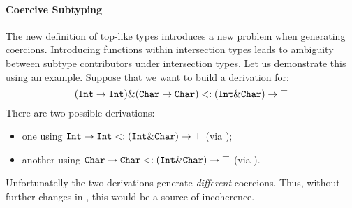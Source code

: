 
\paragraph{Coercive Subtyping}
The new definition of top-like types introduces a new problem when generating coercions. 
Introducing functions within intersection types leads to ambiguity between subtype contributors 
under intersection types.
Let us demonstrate this using an example.
Suppose that we want to build a derivation for:  
\[(\texttt{Int} \to \texttt{Int}) \& (\texttt{Char} \to \texttt{Char}) <: (\texttt{Int} \& \texttt{Char}) \to \top\]
There are two possible derivations: 

\begin{itemize}

\item one using $\texttt{Int} \to \texttt{Int} <: (\texttt{Int} \& \texttt{Char}) \to \top$ 
(via );

\item another using $\texttt{Char} \to \texttt{Char} <: (\texttt{Int} \& \texttt{Char}) \to \top$
(via ).

\end{itemize}

\noindent Unfortunatelly the two derivations generate \emph{different}
coercions.  Thus, without further changes in \name, this would be a
source of incoherence.



